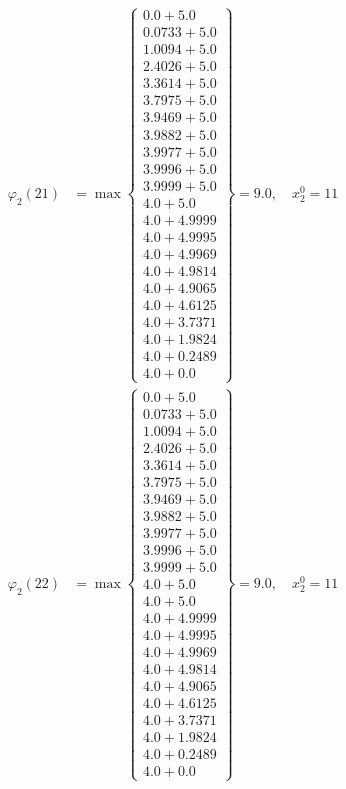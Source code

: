 \documentclass{article}
\begin{document}
\begin{align*}
  
  
  
\varphi_{2}(21) &= \max \left\{ \begin{array}{c}
0.0 + 5.0 \\
 0.0733 + 5.0 \\
 1.0094 + 5.0 \\
 2.4026 + 5.0 \\
 3.3614 + 5.0 \\
 3.7975 + 5.0 \\
 3.9469 + 5.0 \\
 3.9882 + 5.0 \\
 3.9977 + 5.0 \\
 3.9996 + 5.0 \\
 3.9999 + 5.0 \\
 4.0 + 5.0 \\
 4.0 + 4.9999 \\
 4.0 + 4.9995 \\
 4.0 + 4.9969 \\
 4.0 + 4.9814 \\
 4.0 + 4.9065 \\
 4.0 + 4.6125 \\
 4.0 + 3.7371 \\
 4.0 + 1.9824 \\
 4.0 + 0.2489 \\
 4.0 + 0.0
\end{array} \right\}=9.0,\quad x_{2}^0=11\\
  
  
  
  
\varphi_{2}(22) &= \max \left\{ \begin{array}{c}
0.0 + 5.0 \\
 0.0733 + 5.0 \\
 1.0094 + 5.0 \\
 2.4026 + 5.0 \\
 3.3614 + 5.0 \\
 3.7975 + 5.0 \\
 3.9469 + 5.0 \\
 3.9882 + 5.0 \\
 3.9977 + 5.0 \\
 3.9996 + 5.0 \\
 3.9999 + 5.0 \\
 4.0 + 5.0 \\
 4.0 + 5.0 \\
 4.0 + 4.9999 \\
 4.0 + 4.9995 \\
 4.0 + 4.9969 \\
 4.0 + 4.9814 \\
 4.0 + 4.9065 \\
 4.0 + 4.6125 \\
 4.0 + 3.7371 \\
 4.0 + 1.9824 \\
 4.0 + 0.2489 \\
 4.0 + 0.0
\end{array} \right\}=9.0,\quad x_{2}^0=11\\
  

\end{align*}
\end{document}
